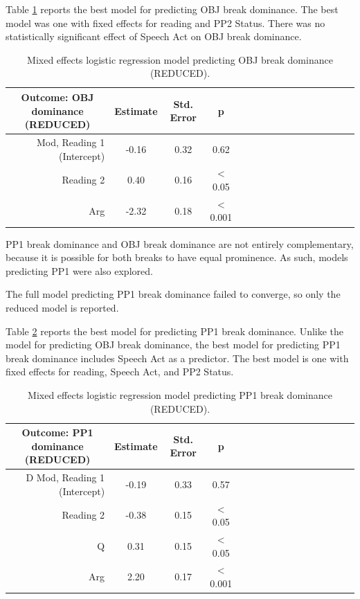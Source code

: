 \documentclass[12pt,oneside]{book}
\begin{document}
Table \ref{tab:odom} reports the best model for predicting OBJ break dominance. The best model was one with fixed effects for reading and PP2 Status. There was no statistically significant effect of Speech Act on OBJ break dominance.

\begin{table}[!h]

\caption{\label{tab:odom}Mixed effects logistic regression model predicting OBJ break dominance (REDUCED).}
\centering
\begin{tabular}{rcccrcccrcccrccc}
\toprule
\multicolumn{1}{c}{Outcome: OBJ dominance (REDUCED)} & \multicolumn{1}{c}{Estimate} & \multicolumn{1}{c}{Std. Error} & \multicolumn{1}{c}{p}\\
\midrule
Mod, Reading 1 (Intercept) & -0.16 & 0.32 & 0.62\\
Reading 2 & 0.40 & 0.16 & < 0.05\\
Arg & -2.32 & 0.18 & < 0.001\\
\bottomrule
\end{tabular}
\end{table}

PP1 break dominance and OBJ break dominance are not entirely complementary, because it is possible for both breaks to have equal prominence. As such, models predicting PP1 were also explored.

The full model predicting PP1 break dominance failed to converge, so only the reduced model is reported.

Table \ref{tab:pdom} reports the best model for predicting PP1 break dominance. Unlike the model for predicting OBJ break dominance, the best model for predicting PP1 break dominance includes Speech Act as a predictor. The best model is one with fixed effects for reading, Speech Act, and PP2 Status.

\begin{table}[!h]

\caption{\label{tab:pdom}Mixed effects logistic regression model predicting PP1 break dominance (REDUCED).}
\centering
\begin{tabular}{rcccrcccrcccrccc}
\toprule
\multicolumn{1}{c}{Outcome: PP1 dominance (REDUCED)} & \multicolumn{1}{c}{Estimate} & \multicolumn{1}{c}{Std. Error} & \multicolumn{1}{c}{p}\\
\midrule
D Mod, Reading 1 (Intercept) & -0.19 & 0.33 & 0.57\\
Reading 2 & -0.38 & 0.15 & < 0.05\\
Q & 0.31 & 0.15 & < 0.05\\
Arg & 2.20 & 0.17 & < 0.001\\
\bottomrule
\end{tabular}
\end{table}
\end{document}
